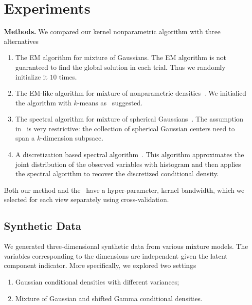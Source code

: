 \documentclass{article}
\begin{document}
\section{Experiments}

{\bf Methods.} We compared our kernel nonparametric algorithm with three alternatives
\begin{enumerate}
  \vspace{-1mm}
  \item The EM algorithm for mixture of Gaussians. The EM algorithm is not guaranteed to find the global solution in each trial. Thus we randomly initialize it $10$ times.
  \item The EM-like algorithm for mixture of nonparametric densities~\citep{BenChaHun09}. We initialied the algorithm with $k$-means as~\citet{BenChaHun09} suggested.
  \item The spectral algorithm for mixture of spherical Gaussians~\citep{Hsu13}. The assumption in~\citet{Hsu13} is very restrictive: the collection of spherical Gaussian centers need to span a $k$-dimension subpsace.
  \item A discretization based spectral algorithm~\citep{Hiroyuki10}. This algorithm approximates the joint distribution of the observed variables with histogram and then applies the spectral algorithm to recover the discretized conditional density. 
  \vspace{-1mm}
\end{enumerate}
Both our method and the~\cite{BenChaHun09} have a hyper-parameter, kernel bandwidth, which we selected for each view separately using cross-validation.

\subsection{Synthetic Data}

We generated three-dimensional synthetic data from various mixture models. The variables corresponding to the dimensions are independent given the latent component indicator. More specifically, we explored two settings
\begin{enumerate}
  \item Gaussian conditional densities with different variances;
  \item Mixture of Gaussian and shifted Gamma conditional densities.
\end{enumerate}
\end{document}
